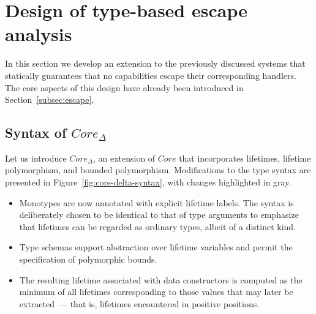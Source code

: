 \documentclass[acmsmall,review,screen]{acmart}
\begin{document}
\section{Design of type-based escape analysis} \label{sec:escape}

In this section we develop an extension to the previously discussed systems that statically guarantees that no capabilities escape their corresponding handlers.
The core aspects of this design have already been introduced in Section~\ref{subsec:escape}.

\subsection{Syntax of $Core_\Delta$}

Let us introduce $Core_\Delta$, an extension of $Core$ that incorporates lifetimes, lifetime polymorphism, and bounded polymorphism.
Modifications to the type syntax are presented in Figure~\ref{fig:core-delta-syntax}, with changes highlighted in gray.
\begin{itemize}
    \item Monotypes are now annotated with explicit lifetime labels.
    The syntax is deliberately chosen to be identical to that of type arguments to emphasize that lifetimes can be regarded as ordinary types, albeit of a distinct kind.
    \item Type schemas support abstraction over lifetime variables and permit the specification of polymorphic bounds.
    \item The resulting lifetime associated with data constructors is computed as the minimum of all lifetimes corresponding to those values that may later be extracted~--- that is, lifetimes encountered in positive positions.
\end{itemize}

\end{document}
